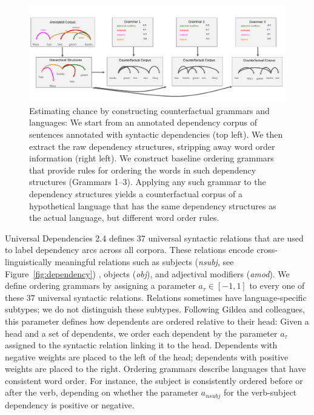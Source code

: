 \begin{figure}
\centering
\includegraphics[width=\textwidth]{figures-gdrive/counterfactual-languages.pdf}
\caption{Estimating chance by constructing counterfactual grammars and languages: We start from an annotated dependency corpus of sentences annotated with syntactic dependencies (top left). We then extract the raw dependency structures, stripping away word order information (right left).
We construct baseline ordering grammars that provide rules for ordering the words in such dependency structures (Grammars 1--3).
Applying any such grammar to the dependency structures yields a counterfactual corpus of a hypothetical language that has the same dependency structures as the actual language, but different word order rules.}\label{fig:grammars}
\end{figure}


Universal Dependencies 2.4 defines 37 universal syntactic relations that are used to label dependency arcs across all corpora.
These relations encode cross-linguistically meaningful relations such as subjects (\textit{nsubj}, see Figure~\ref{fig:dependency}) , objects (\textit{obj}), and adjectival modifiers (\textit{amod}).
We define ordering grammars by assigning a parameter $a_\tau \in [-1,1]$ to every one of these 37 universal syntactic relations.
Relations sometimes have language-specific subtypes; we do not distinguish these subtypes.
Following Gildea and colleagues, this parameter defines how dependents are ordered relative to their head:
Given a head and a set of dependents, we order each dependent by the parameter $a_\tau$ assigned to the syntactic relation linking it to the head.
Dependents with negative weights are placed to the left of the head; dependents with positive weights are placed to the right. Ordering grammars describe languages that have consistent word order.
For instance, the subject is consistently ordered before or after the verb, depending on whether the parameter $a_{nsubj}$ for the verb-subject dependency is positive or negative.

